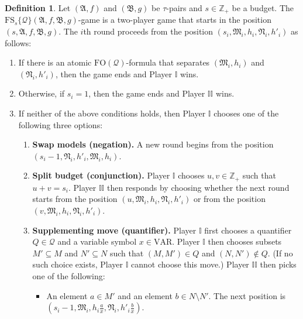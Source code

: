 \documentclass{article}
\theoremstyle{definition}
\newtheorem{definition}[theorem]{Definition}
\begin{document}
\begin{definition}
    Let $(\mathfrak{A},f)$ and $(\mathfrak{B},g)$ be $\tau$-pairs and
    $s \in \mathbb{Z}_+$ be a budget. The
    $\mathrm{FS}_s\{\mathcal{Q}\}(\mathfrak{A},f,\mathfrak{B},g)$-game is a
    two-player game that starts in the position
    $(s,\mathfrak{A},f,\mathfrak{B},g)$. The $i$th round proceeds from
    the position $(s_i,\mathfrak{M}_i,h_i,\mathfrak{N}_i,h'_i)$ as follows:
    \begin{enumerate}
        \item If there is an atomic $\mathrm{FO}(\mathcal{Q})$-formula
        that separates $(\mathfrak{M}_i,h_i)$ and
        $(\mathfrak{N}_i,h'_i)$, then the game ends and Player
        $\mathbb{I}$ wins.
        \item Otherwise, if $s_i=1$, then the game ends and Player
        $\mathbb{II}$ wins.
        \item If neither of the above conditions holds, then Player
        $\mathbb{I}$ chooses one of the following three options:
        \begin{enumerate}
            \item \textbf{Swap models (negation).} A new round begins from the position $(s_i-1,\mathfrak{N}_i,h'_i,\mathfrak{M}_i,h_i)$.
            \item \textbf{Split budget (conjunction).} Player
            $\mathbb{I}$ chooses $u,v\in\mathbb{Z}_+$ such that
            $u+v=s_i$. Player $\mathbb{II}$ then responds by
            choosing whether the next round starts from the
            position $(u,\mathfrak{M}_i,h_i,\mathfrak{N}_i,h'_i)$
            or from the position
            $(v,\mathfrak{M}_i,h_i,\mathfrak{N}_i,h'_i)$.
            \item \textbf{Supplementing move (quantifier).} Player
            $\mathbb{I}$ first chooses a quantifier
            $Q\in\mathcal{Q}$ and a variable symbol
            $x\in\mathrm{VAR}$. Player $\mathbb{I}$ then chooses
            subsets $M'\subseteq M$ and $N'\subseteq N$ such that
            $(M,M')\in Q$ and $(N,N')\notin Q$. (If no such
            choice exists, Player $\mathbb{I}$ cannot choose this
            move.) Player $\mathbb{II}$ then picks one of the
            following:
            \begin{itemize}
                \item An element $a\in M'$ and an element
                $b\in N\setminus N'$. The next position is
                $(s_i-1,\mathfrak{M}_i,h_i\frac{a}{x},
                \mathfrak{N}_i,h'_i\frac{b}{x})$.

\end{itemize}
\end{enumerate}
\end{enumerate}
\end{definition}
\end{document}
